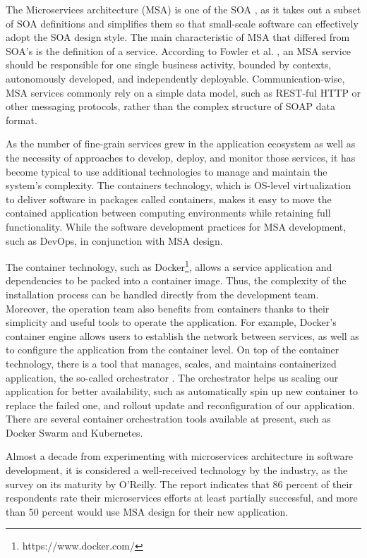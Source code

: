 The Microservices architecture (MSA) is one of the SOA , as it takes out a subset of SOA definitions and simplifies them so that small-scale software can effectively adopt the SOA design style\cite{SOAopengroup-msa}. The main characteristic of MSA that differed from SOA's is the definition of a service. According to Fowler et al. \cite{fowler-2014}, an MSA service should be responsible for one single business activity, bounded by contexts, autonomously developed, and independently deployable. Communication-wise, MSA services commonly rely on a simple data model, such as REST-ful HTTP or other messaging protocols, rather than the complex structure of SOAP data format\cite{SOAopengroup-msa, SOAopengroup-digitalage}.

As the number of fine-grain services grew in the application ecosystem as well as the necessity of approaches to develop, deploy, and monitor those services, it has become typical to use additional technologies to manage and maintain the system's complexity. The containers technology, which is OS-level virtualization to deliver software in packages called containers, makes it easy to move the contained application between computing environments while retaining full functionality\cite{understanding-containers,docker-container}. While the software development practices for MSA development, such as DevOps\cite{wilsenach-2015}, in conjunction with MSA design.

The container technology, such as Docker\footnote{https://www.docker.com/}, allows a service application and dependencies to be packed into a container image. Thus, the complexity of the installation process can be handled directly from the development team. Moreover, the operation team also benefits from containers thanks to their simplicity and useful tools to operate the application. For example, Docker's container engine allows users to establish the network between services, as well as to configure the application from the container level. On top of the container technology, there is a tool that manages, scales, and maintains containerized application, the so-called orchestrator \cite{docker-orchestration}. The orchestrator helps us scaling our application for better availability, such as automatically spin up new container to replace the failed one, and rollout  update and reconfiguration of our application. There are several container orchestration tools available at present, such as Docker Swarm\cite{docker-swarm} and Kubernetes\cite{kubernetes}.

Almost a decade from experimenting with microservices architecture in software development, it is considered a well-received technology by the industry, as the survey on its maturity by O'Reilly\cite{MICROREP}. The report indicates that 86 percent of their respondents rate their microservices efforts at least partially successful, and more than 50 percent would use MSA design for their new application. 


